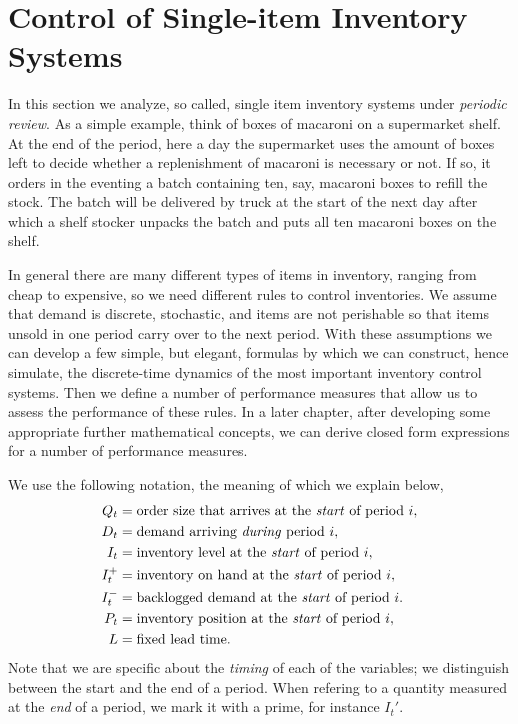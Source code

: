 \documentclass[queueing-book.tex]{subfiles}
\begin{document}
\section{Control of Single-item Inventory Systems}
\label{sec:single-item-invent}

In this section we analyze, so called, single item inventory systems under \emph{periodic review}.
As a simple example, think of boxes of macaroni on a supermarket shelf.
At the end of the period, here a day the supermarket uses the amount of boxes left to decide whether a replenishment of macaroni is necessary or not.
If so, it orders in the eventing a batch containing ten, say, macaroni boxes to refill the stock.
The batch will be delivered by truck at the start of the next day after which a shelf stocker unpacks the batch and puts all ten macaroni boxes on the shelf.

In general there are many different types of items in inventory, ranging from cheap to expensive, so we need different rules to control inventories.
We assume that demand is discrete, stochastic, and items are not perishable so that items unsold in one period carry over to the next period.
With these assumptions we can develop a few simple, but elegant, formulas by which we can construct, hence simulate, the discrete-time dynamics of the most important inventory control systems.
Then we define a number of performance measures that allow us to assess the performance of these rules.
In a later chapter, after developing some appropriate further mathematical concepts, we can derive closed form expressions for a number of performance measures.


We use the following notation, the meaning of which we explain below,
\begin{align*}
  Q_t &= \text{order size that arrives at  the \emph{start} of period~$i$}, \\
  D_t &= \text{demand arriving \emph{during} period~$i$}, \\
  I_t &= \text{inventory level at the \emph{start} of period~$i$}, \\
I_t^+ &= \text{inventory on hand at the \emph{start} of period~$i$}, \\
I_t^- &= \text{backlogged demand at the \emph{start} of period~$i$}. \\
  P_t &= \text{inventory position at the \emph{start} of period~$i$}, \\
  L &= \text{fixed lead time}.
\end{align*}
Note  that we are specific about the \emph{timing} of each of the  variables; we distinguish between the start and the end of a period. When refering to a quantity measured at the \emph{end} of a period, we mark it with a prime, for instance $I_t'$.
\end{document}
